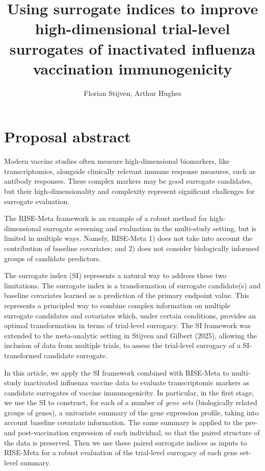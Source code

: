 \documentclass{article}
\title{Using surrogate indices to improve high-dimensional trial-level surrogates of inactivated influenza vaccination immunogenicity}
\author[]{Florian Stijven, Arthur Hughes}
\date{}
\begin{document}
\maketitle

\section*{Proposal abstract}

Modern vaccine studies often measure high-dimensional biomarkers, like transcriptomics, alongside clinically relevant immune response measures, such as antibody responses. These complex markers may be good surrogate candidates, but their high-dimensionality and complexity represent significant challenges for surrogate evaluation. 

The RISE-Meta framework is an example of a robust method for high-dimensional surrogate screening and evaluation in the multi-study setting, but is limited in multiple ways. Namely, RISE-Meta 1) does not take into account the contribution of baseline covariates; and 2) does not consider biologically informed groups of candidate predictors.

The surrogate index (SI) represents a natural way to address these two limitations. The surrogate index is a transformation of surrogate candidate(s) and baseline covariates learned as a prediction of the primary endpoint value. This represents a principled way to combine complex information on multiple surrogate candidates and covariates which, under certain conditions, provides an optimal transformation in terms of trial-level surrogacy. The SI framework was extended to the meta-analytic setting in Stijven and Gilbert (2025), allowing the inclusion of data from multiple trials, to assess the trial-level surrogacy of a SI-transformed candidate surrogate.

In this article, we apply the SI framework combined with RISE-Meta to multi-study inactivated influenza vaccine data to evaluate transcriptomic markers as candidate surrogates of vaccine immunogenicity. In particular, in the first stage, we use the SI to construct, for each of a number of \textit{gene sets} (biologically related groups of genes), a univariate summary of the gene expression profile, taking into account baseline covariate information. The same summary is applied to the pre- and post-vaccination expression of each individual, so that the paired structure of the data is preserved. Then we use these paired surrogate indices as inputs to RISE-Meta for a robust evaluation of the trial-level surrogacy of each gene set-level summary. 
\end{document}
